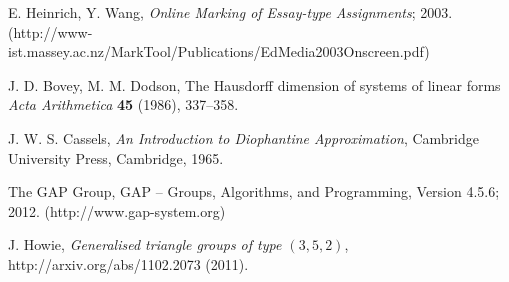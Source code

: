\documentclass[12pt]{article}  %
\theoremstyle{definition}
\theoremstyle{remark}
\begin{document}
\begin{thebibliography}{99}

% 
%



%

E. Heinrich, Y. Wang,
{\em Online Marking of Essay-type Assignments};
2003.(http://www-ist.massey.ac.nz/MarkTool/Publications/EdMedia2003Onscreen.pdf)

J. D. Bovey, M. M. Dodson,                         %
The Hausdorff dimension of systems of linear forms %
{\em Acta Arithmetica}                             %
{\bf 45}                                           %
(1986), 337--358.                                   %

%
J. W. S. Cassels,                                  %
{\em An Introduction to Diophantine Approximation},%
Cambridge University Press, Cambridge, 1965.       %

%
The GAP Group, GAP -- Groups, Algorithms, and Programming,  %
Version 4.5.6; 2012. %
(http://www.gap-system.org)  %


%
J. Howie,                                            %
{\em Generalised triangle groups of type $(3,5,2)$}, %
http://arxiv.org/abs/1102.2073                       %
(2011).                                              %
\end{thebibliography}
\end{document}
